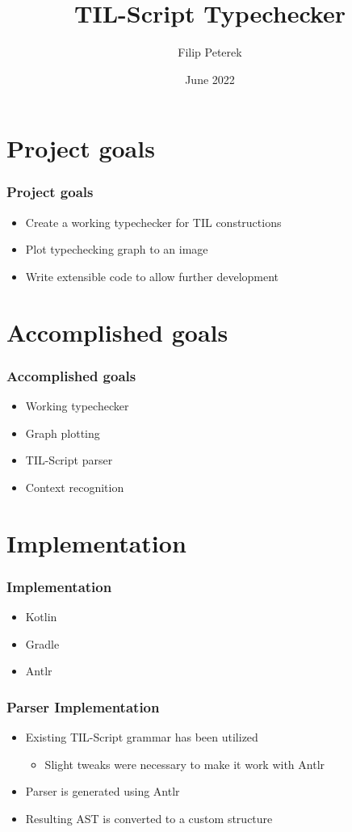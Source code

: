 \documentclass{beamer}
\title{TIL-Script Typechecker}
\author{Filip Peterek}
\institute{Technical University of Ostrava}
\date{June 2022}
\begin{document}
\frame{\titlepage}

\section{Project goals}

\begin{frame}
    \frametitle{Project goals}
    \begin{itemize}
        \item Create a working typechecker for TIL constructions
        \item Plot typechecking graph to an image
        \item Write extensible code to allow further development
    \end{itemize}
\end{frame}

\section{Accomplished goals}

\begin{frame}
    \frametitle{Accomplished goals}
    \begin{itemize}
        \item Working typechecker
        \item Graph plotting
        \item TIL-Script parser
        \item Context recognition
    \end{itemize}
\end{frame}

\section{Implementation}

\begin{frame}
    \frametitle{Implementation}
    \begin{itemize}
        \item Kotlin
        \item Gradle
        \item Antlr
    \end{itemize}
\end{frame}

\begin{frame}
    \frametitle{Parser Implementation}
    \begin{itemize}
        \item Existing TIL-Script grammar has been utilized
            \begin{itemize}
                \item Slight tweaks were necessary to make it work with Antlr
            \end{itemize}
        \item Parser is generated using Antlr
        \item Resulting AST is converted to a custom structure
    \end{itemize}
\end{frame}
\end{document}
